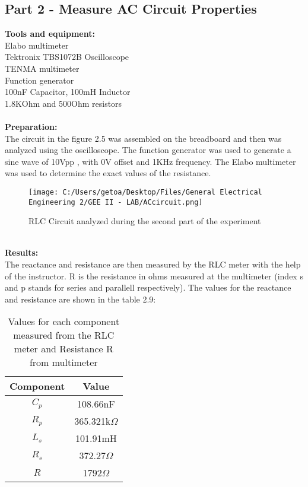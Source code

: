 \documentclass[12pt]{report}
\begin{document}
\subsection{Part 2 - Measure AC Circuit Properties}
\textbf{Tools and equipment:} \\
Elabo multimeter\\Tektronix TBS1072B Oscilloscope \\
TENMA multimeter\\  Function generator  \\ 
100nF Capacitor, 100mH Inductor\\
1.8KOhm and 500Ohm resistors\\
\\
\textbf{Preparation:} \\
The circuit in the figure 2.5 was assembled on the breadboard and then was analyzed using the oscilloscope. The function generator was used to generate a sine wave of 10Vpp , with 0V offset and 1KHz frequency. The Elabo multimeter was used to determine the exact values of the resistance.
\begin{figure}[ht]
  \centering
  \texttt{[image: C:/Users/getoa/Desktop/Files/General Electrical Engineering 2/GEE II - LAB/ACcircuit.png]}
  \caption{RLC Circuit analyzed during the second part of the experiment\\}
\end{figure}
\\
\textbf{Results:}\\
The reactance and resistance are then measured by the RLC meter with the help of the instructor. R is the
resistance in ohms measured at the multimeter (index s and p stands for series and parallell respectively). The values for the reactance and resistance
are shown in the table 2.9: 
\begin{table}[t]
\centering
\begin{minipage}{0.8\linewidth}
\centering
\begin{tabular}{|c|c|}
\hline
\rowcolor{lightblue} \textbf{Component} & \textbf{Value} \\
\hline
$C_p$ & 108.66nF \\
$R_p$ & 365.321k$\Omega$ \\
$L_s$ & 101.91mH \\
$R_s$ & 372.27$\Omega$ \\
$R$ & 1792$\Omega$ \\
\hline
\end{tabular}
\caption{Values for each component measured from the RLC meter and Resistance R from multimeter}
\label{tab:example}
\end{minipage}
\hfill
\end{table}
\end{document}
